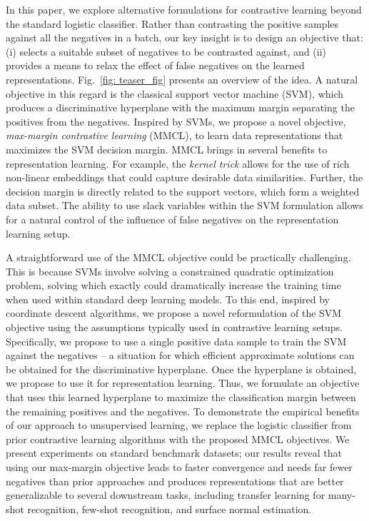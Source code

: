 \documentclass[letterpaper]{article} \usepackage{aaai22}  \usepackage{times}  \usepackage{helvet}  \usepackage{courier}  \usepackage[hyphens]{url}  \usepackage{graphicx} \urlstyle{rm} \def\UrlFont{\rm}  \usepackage{natbib}  \usepackage{caption} \DeclareCaptionStyle{ruled}{labelfont=normalfont,labelsep=colon,strut=off} \frenchspacing  \setlength{\pdfpagewidth}{8.5in}  \setlength{\pdfpageheight}{11in}
\begin{document}
In this paper, we explore alternative formulations for contrastive learning beyond the standard logistic classifier. Rather than contrasting the positive samples against all the negatives in a batch, our key insight is to design an objective that: (i) selects a suitable subset of  negatives to be contrasted against, and (ii) provides a means to  relax the effect of false negatives on the learned representations. Fig.~\ref{fig: teaser_fig} presents an overview of the idea. A natural objective in this regard is the classical support vector machine (SVM), which produces a discriminative hyperplane with the maximum margin separating the positives from the negatives. Inspired by SVMs, we propose a novel objective, \emph{max-margin contrastive learning} (MMCL), to learn data representations that maximizes the SVM decision margin. MMCL brings in several benefits to representation learning. For example, the \emph{kernel trick} allows for the use of rich non-linear embeddings that could capture desirable data similarities. Further, the decision margin is directly related to the support vectors, which form a weighted data subset. The ability to use slack variables within the SVM formulation allows for a natural control of the influence of false negatives on  the representation learning setup.

A straightforward use of the MMCL objective could be practically challenging. This is because SVMs involve solving a constrained quadratic optimization problem, solving which exactly could dramatically increase the training time when used within standard deep learning models. To this end, inspired by coordinate descent algorithms, we propose a novel reformulation of the SVM objective using the assumptions typically used in contrastive learning setups. Specifically, we propose to use a single positive data sample to train the SVM against the negatives -- a situation for which efficient approximate solutions can be obtained for the discriminative hyperplane. Once the hyperplane is obtained, we propose to use it for representation learning. Thus, we formulate an objective that uses this learned hyperplane to maximize the classification margin between the remaining positives and the negatives. To demonstrate the empirical benefits of our approach to unsupervised learning, we replace the logistic classifier from prior  contrastive learning algorithms with the proposed MMCL objectives. We present experiments on standard benchmark datasets; our results reveal that using our max-margin objective leads to {faster convergence} and needs {far fewer negatives} than prior approaches and produces representations that are {better generalizable} to several downstream tasks, including transfer learning for many-shot recognition, few-shot recognition, and surface normal estimation.
\end{document}

